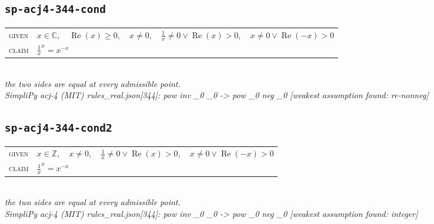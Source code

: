 \documentclass[11pt]{article}
\begin{document}
\subsection*{\texttt{sp-acj4-344-cond}}
\begin{tabular}{@{}l@{\quad}l@{}}
\textsc{given} & $x \in \mathbb{C},\quad \operatorname{Re}\left(x\right) \ge 0,\quad x \neq 0,\quad \frac{1}{x} \neq 0 \lor \operatorname{Re}\left(x\right) > 0,\quad x \neq 0 \lor \operatorname{Re}\left(-x\right) > 0$ \\[4pt]
\textsc{claim} & $\displaystyle \frac{1}{x}^{x} = x^{-x}$ \\
\end{tabular}\\[2pt]
{\small\emph{the two sides are equal at every admissible point.}}\\
\emph{SimpliPy acj-4 (MIT) rules\_real.json[344]: pow inv \_0 \_0  ->  pow \_0 neg \_0  [weakest assumption found: re-nonneg]}\\

\subsection*{\texttt{sp-acj4-344-cond2}}
\begin{tabular}{@{}l@{\quad}l@{}}
\textsc{given} & $x \in \mathbb{Z},\quad x \neq 0,\quad \frac{1}{x} \neq 0 \lor \operatorname{Re}\left(x\right) > 0,\quad x \neq 0 \lor \operatorname{Re}\left(-x\right) > 0$ \\[4pt]
\textsc{claim} & $\displaystyle \frac{1}{x}^{x} = x^{-x}$ \\
\end{tabular}\\[2pt]
{\small\emph{the two sides are equal at every admissible point.}}\\
\emph{SimpliPy acj-4 (MIT) rules\_real.json[344]: pow inv \_0 \_0  ->  pow \_0 neg \_0  [weakest assumption found: integer]}\\
\end{document}
